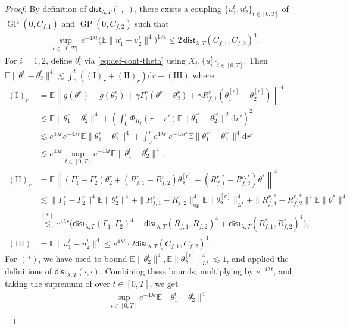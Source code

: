 \documentclass[11pt,letterpaper,reqno]{amsart}
\theoremstyle{definition}
\def\d{\mathrm{d}}
\def\E{\mathbb{E}}
\def\GP{\operatorname{GP}}
\def\Rf{R_f}
\newcommand{\lbddst}[2]{\mathsf{dist}_{\lambda,T}(#1,#2)}
\newcommand{\norm}[1]{\|#1\|}
\newcommand{\normop}[1]{\|#1\|_{\mathrm{op}}}
\begin{document}
\begin{proof}
By definition of $\lbddst{\cdot}{\cdot}$,
there exists a coupling $\{u_1^t,u_2^t\}_{t \in [0,T]}$ of $\GP(0,C_{f,1})$ and
$\GP(0,C_{f,2})$ such that
\begin{align*}
\sup_{t \in [0, T]} e^{-4\lambda t} \big(\mathbb{E}
\norm{u_1^t-u_2^t}^4\big)^{1/4}
\leq 2\,\lbddst{C_{f,1}}{C_{f,2}}^4.
\end{align*}
For $i=1,2$, define $\theta_i^t$ via \eqref{eq:def-cont-theta} using
$X_i,\{u_i^t\}_{t \in [0,T]}$. Then
$\E \|\theta^t_1 - \theta^t_2\|^4 \lesssim
\int_0^t((\mathrm{I})_r+(\mathrm{II})_r)\d r +(\mathrm{III})$ where 
\begin{align*}
    (\mathrm{I})_r &=\E\left\|g(\theta_1^r)-g(\theta_2^r)+\gamma
\Gamma_1^r(\theta_1^r-\theta_2^r)+\gamma
R_{f,1}^r(\theta_1^{[r]}-\theta_2^{[r]})\right\|^4\\
    &\lesssim \E\norm{\theta_1^r-\theta_2^r}^4 + \left(\int_0^r \Phi_{\Rf}(r-r')
\E\norm{\theta^{r'}_1 - \theta^{r'}_2}^2 \d r'\right)^2\\
    &\lesssim e^{4\lambda r}e^{-4\lambda r}\E\norm{\theta_1^r-\theta_2^r}^4 +\int_0^r
e^{4\lambda r'}e^{-4\lambda r'}\E\norm{\theta^{r'}_1 - \theta^{r'}_2}^4 \d r'\\
    &\lesssim e^{4\lambda r} \sup_{t\in[0,T]}e^{-4\lambda t}
\E\norm{\theta_1^t-\theta_2^t}^4,\\
    (\mathrm{II})_r&=\E\left\|(\Gamma_1^r-\Gamma_2^r)\theta_2^r
+(R_{f,1}^r-R_{f,2}^r)\theta_2^{[r]}+
(R_{f,1}^{r,*}-R_{f,2}^{r,*})\theta^*\right\|^4\\
    &\lesssim
\norm{\Gamma_1^r-\Gamma_2^r}^4\E\|\theta_2^r\|^4+\normop{{R_{f,1}^r-R_{f,2}^r}}^4\E\|\theta_2^{[r]}\|_{L^4}^4 +
\norm{R_{f,1}^{r,*}-R_{f,2}^{r,*}}^4\E\|\theta^*\|^4\\
&\overset{(*)}\lesssim e^{4\lambda r}\Big(\lbddst{\Gamma_1}{\Gamma_2}^4
+\lbddst{R_{f,1}}{R_{f,2}}^4+\lbddst{R_{f,1}^*}{R_{f,2}^*}^4\Big),\\
(\mathrm{III})&=\E \norm{u_1^t-u_2^t}^4
\leq e^{4\lambda t} \cdot 2\lbddst{C_{f,1}}{C_{f,2}}^4.
\end{align*}
For $(*)$, we have used  to bound
$\E\|\theta^t_2\|^4,\E\|\theta_2^{[r]}\|_{L^4}^4 \lesssim 1$, and applied the
definitions of $\lbddst{\cdot}{\cdot}$.
Combining these bounds, multiplying by $e^{-4\lambda t}$, and taking the
supremum of over $t \in [0,T]$, we get
\begin{align*}
    &\sup_{t\in[0,T]}e^{-4\lambda t}\E\norm{\theta_1^t-\theta_2^t}^4\\

\end{align*}
\end{proof}
\end{document}
